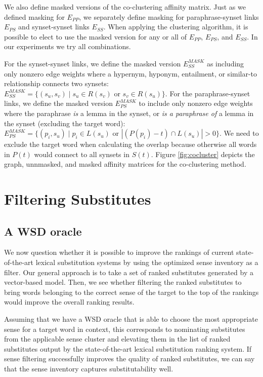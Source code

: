 \documentclass[11pt]{article}
\begin{document}
We also define masked versions of the co-clustering affinity matrix. Just as we defined masking for $E_{PP}$, we separately define masking for paraphrase-synset links $E_{PS}$ and synset-synset links $E_{SS}$. When applying the clustering algorithm, it is possible to elect to use the masked version for any or all of $E_{PP}$, $E_{PS}$, and $E_{SS}$. In our experiments we try all combinations.

For the synset-synset links, we define the masked version $E_{SS}^{MASK}$ as including only nonzero edge weights where a hypernym, hyponym, entailment, or similar-to relationship connects two synsets: $E_{SS}^{MASK} = \{(s_u, s_v) \mid s_u \in R(s_v) \text{ or } s_v \in R(s_u)\}$. For the paraphrase-synset links, we define the masked version $E_{PS}^{MASK}$ to include only nonzero edge weights where the paraphrase \textit{is} a lemma in the synset, or \textit{is a paraphrase of} a lemma in the synset (excluding the target word): $E_{PS}^{MASK} = \{(p_i, s_u) \mid p_i \in L(s_u) \text{ or } |(P(p_i)-t) \cap L(s_u)| > 0 \}$. We need to exclude the target word when calculating the overlap because otherwise all words in $P(t)$ would connect to all synsets in $S(t)$. Figure \ref{fig:cocluster} depicts the graph, unnmasked, and masked affinity matrices for the co-clustering method. 


\section{Filtering Substitutes}

\subsection{A WSD oracle}

We now question whether it is possible to improve the rankings of current state-of-the-art lexical substitution systems by using the optimized sense inventory as a filter. Our general approach is to take a set of ranked substitutes generated by a vector-based model. Then, we see whether filtering the ranked substitutes to bring words belonging to the correct sense of the target to the top of the rankings would improve the overall ranking results. 

Assuming that we have a WSD oracle that is able to choose the most appropriate sense for a target word in context, this corresponds to nominating substitutes from the applicable sense cluster and elevating them in the list of ranked substitutes output by the state-of-the-art lexical substitution ranking system. 
If sense filtering successfully improves the quality of ranked substitutes, we can say that the sense inventory captures substitutability well. 
\end{document}
